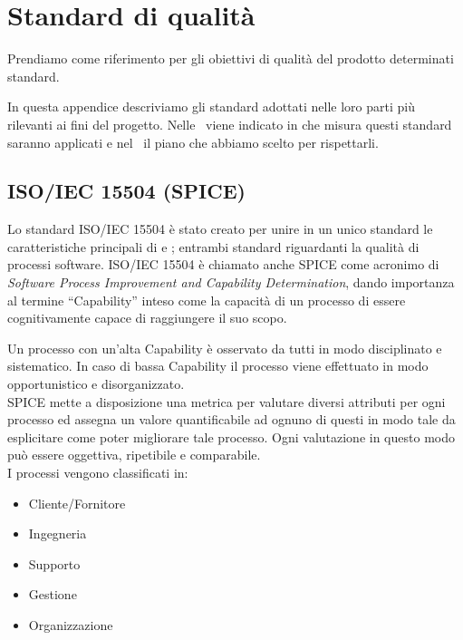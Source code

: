 \newpage

\section{Standard di qualità}	\label{standard di qualità}
Prendiamo come riferimento per gli obiettivi di qualità del prodotto determinati standard.


In questa appendice descriviamo gli standard adottati nelle loro parti più rilevanti ai fini del progetto. Nelle \NdPd\ viene indicato in che misura questi standard saranno applicati e nel \PdQd\ il piano che abbiamo scelto per rispettarli.

	\subsection{ISO/IEC 15504 (SPICE)}\label{iso15504}
	Lo standard ISO/IEC 15504 è stato creato per unire in un unico standard le caratteristiche principali di  e ; entrambi standard riguardanti la qualità di processi software.
	ISO/IEC 15504 è chiamato anche SPICE come acronimo di \textit{Software Process Improvement and Capability Determination}, dando importanza al termine ``Capability'' inteso come la capacità di un processo di essere cognitivamente capace di raggiungere il suo scopo. 
	
	Un processo con un'alta Capability è osservato da tutti in modo disciplinato e sistematico.
	In caso di bassa Capability il processo viene effettuato in modo opportunistico e disorganizzato.\\
	
	SPICE mette a disposizione una metrica per valutare diversi attributi per ogni processo ed assegna un valore quantificabile ad ognuno di questi in modo tale da esplicitare come poter migliorare tale processo. Ogni valutazione in questo modo può essere oggettiva, ripetibile e comparabile.\\
	
	I processi vengono classificati in:

	

	\begin{itemize}
		\item Cliente/Fornitore
		\item Ingegneria
		\item Supporto
		\item Gestione
		\item Organizzazione
	\end{itemize}
	
